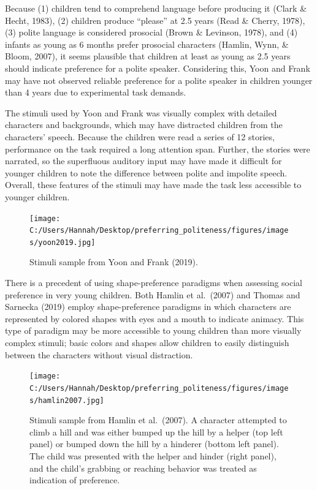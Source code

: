 \documentclass[
  english,
  man,floatsintext]{apa6}
\begin{document}
Because (1) children tend to comprehend language before producing it (Clark \& Hecht, 1983), (2) children produce ``please'' at 2.5 years (Read \& Cherry, 1978), (3) polite language is considered prosocial (Brown \& Levinson, 1978), and (4) infants as young as 6 months prefer prosocial characters (Hamlin, Wynn, \& Bloom, 2007), it seems plausible that children at least as young as 2.5 years should indicate preference for a polite speaker. Considering this, Yoon and Frank may have not observed reliable preference for a polite speaker in children younger than 4 years due to experimental task demands.

The stimuli used by Yoon and Frank was visually complex with detailed characters and backgrounds, which may have distracted children from the characters' speech. Because the children were read a series of 12 stories, performance on the task required a long attention span. Further, the stories were narrated, so the superfluous auditory input may have made it difficult for younger children to note the difference between polite and impolite speech. Overall, these features of the stimuli may have made the task less accessible to younger children.

\begin{figure}
\centering
\texttt{[image: C:/Users/Hannah/Desktop/preferring\_politeness/figures/images/yoon2019.jpg]}
\caption{Stimuli sample from Yoon and Frank (2019).}
\end{figure}

There is a precedent of using shape-preference paradigms when assessing social preference in very young children. Both Hamlin et al.~(2007) and Thomas and Sarnecka (2019) employ shape-preference paradigms in which characters are represented by colored shapes with eyes and a mouth to indicate animacy. This type of paradigm may be more accessible to young children than more visually complex stimuli; basic colors and shapes allow children to easily distinguish between the characters without visual distraction.

\newpage

\begin{figure}
\centering
\texttt{[image: C:/Users/Hannah/Desktop/preferring\_politeness/figures/images/hamlin2007.jpg]}
\caption{Stimuli sample from Hamlin et al.~(2007). A character attempted to climb a hill and was either bumped up the hill by a helper (top left panel) or bumped down the hill by a hinderer (bottom left panel). The child was presented with the helper and hinder (right panel), and the child's grabbing or reaching behavior was treated as indication of preference.}
\end{figure}
\end{document}
